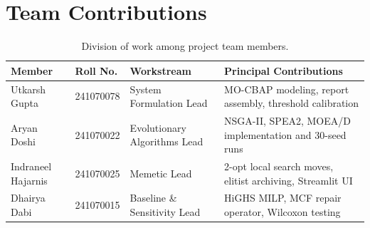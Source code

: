\documentclass[11pt,a4paper,oneside]{report}
\begin{document}
\chapter{Team Contributions}
\begin{table}[htbp]
\centering
\caption{Division of work among project team members.}
\label{tab:division_of_work}
\begin{tabularx}{\textwidth}{llll}
\toprule
\textbf{Member} & \textbf{Roll No.} & \textbf{Workstream} & \textbf{Principal Contributions} \\
\midrule
Utkarsh Gupta & 241070078 & System Formulation Lead & MO-CBAP modeling, report assembly, threshold calibration \\
Aryan Doshi & 241070022 & Evolutionary Algorithms Lead & NSGA-II, SPEA2, MOEA/D implementation and 30-seed runs \\
Indraneel Hajarnis & 241070025 & Memetic Lead & 2-opt local search moves, elitist archiving, Streamlit UI \\
Dhairya Dabi & 241070015 & Baseline \& Sensitivity Lead & HiGHS MILP, MCF repair operator, Wilcoxon testing \\
\bottomrule
\end{tabularx}
\end{table}

\end{document}
